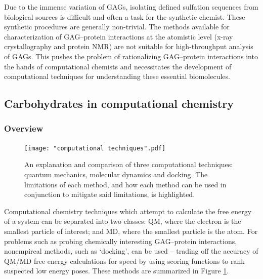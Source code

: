 \documentclass[journal=jctcce,manuscript=article]{achemso}
\begin{document}
{Due to the immense variation of \acp{GAG}, isolating defined sulfation sequences from biological sources is difficult and often a task for the synthetic chemist.  \cite{Gama2006SulfationActivity}
These synthetic procedures are generally non-trivial. \cite{Das2001SynthesisHeparin} 
The methods available for characterization of 
\ac{GAG}--protein interactions at the atomistic level (x-ray crystallography and protein NMR) are not suitable for high-throughput analysis of \acp{GAG}. \cite{Sankaranarayanan2018SoAgain}
This pushes the problem of rationalizing \ac{GAG}--protein interactions into the hands of computational chemists and necessitates the development of computational techniques for understanding these essential biomolecules. \cite{Woods2018PredictingComplexes, Sankaranarayanan2018SoAgain}


\pagebreak
\subsection{Carbohydrates in computational chemistry}
\subsubsection{Overview}

\begin{figure}[bl!]
    \centering
    \texttt{[image: "computational techniques".pdf]}
    \caption{An explanation and comparison of three computational techniques: quantum mechanics, molecular dynamics and docking. The limitations of each method, and how each method can be used in conjunction to mitigate said limitations, is highlighted.}
    \label{fig:comp}
\end{figure}


Computational chemistry techniques which attempt to calculate the free energy of a system can be separated into two classes: \ac{QM}, where the electron is the smallest particle of interest; and \acf{MD}, where the smallest particle is the atom. \cite{Jensen2007IntroductionEdition, Dror2012BiomolecularBiology}
For problems such as probing chemically interesting \ac{GAG}--protein interactions, nonempircal methods, such as `docking', can be used -- trading off the accuracy of \ac{QM}/\ac{MD} free energy calculations for speed by using scoring functions to rank suspected low energy poses. \cite{Halperin2002PrinciplesFunctions}
These methods are summarized in Figure \ref{fig:comp}.

}
\end{document}
